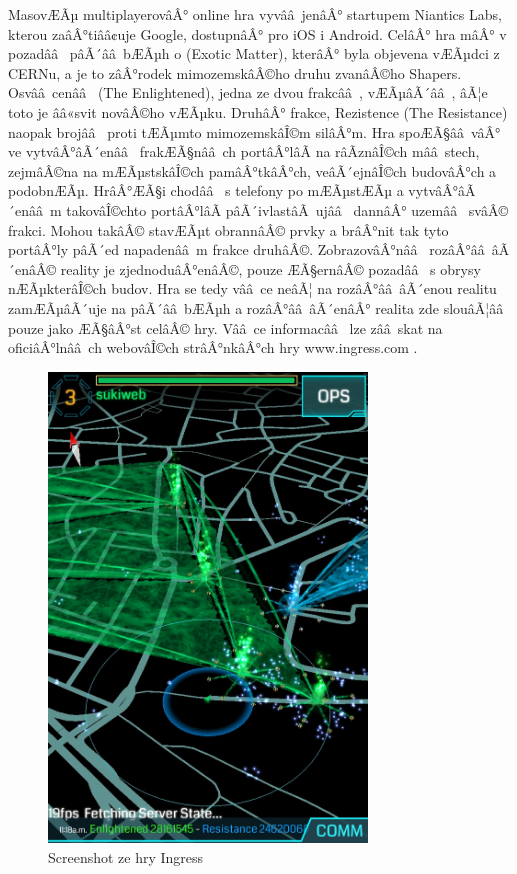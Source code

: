 \documentclass[twoside,12pt]{article}
\begin{document}
%
% 

MasovÆÃµ multiplayerovâÂ° online hra vyvââ jenâÂ° startupem Niantics Labs, kterou zaâÂ°tiââ¢uje Google, dostupnâÂ° pro iOS i Android. CelâÂ° hra mâÂ° v pozadââ  pâÃ´ââ bÆÃµh o  (Exotic Matter), kterâÂ° byla objevena vÆÃµdci z CERNu, a je to zâÂ°rodek mimozemskâÂ©ho druhu zvanâÂ©ho Shapers. Osvââ cenââ  (The Enlightened), jedna ze dvou frakcââ , vÆÃµâÃ´ââ , âÃ¦e toto je ââ«svit novâÂ©ho vÆÃµku. DruhâÂ° frakce, Rezistence (The Resistance) naopak brojââ  proti tÆÃµmto mimozemskâÎ©m silâÂ°m. Hra spoÆÃ§ââ vâÂ° ve vytvâÂ°âÃ´enââ  frakÆÃ§nââ ch portâÂ°lâÃ na râÃznâÎ©ch mââ stech, zejmâÂ©na na mÆÃµstskâÎ©ch pamâÂ°tkâÂ°ch, veâÃ´ejnâÎ©ch budovâÂ°ch a podobnÆÃµ. HrâÂ°ÆÃ§i chodââ  s telefony po mÆÃµstÆÃµ a vytvâÂ°âÃ´enââ m takovâÎ©chto portâÂ°lâÃ pâÃ´ivlastâÃ ujââ  dannâÂ° uzemââ  svâÂ© frakci. Mohou takâÂ© stavÆÃµt obrannâÂ© prvky a brâÂ°nit tak tyto portâÂ°ly pâÃ´ed napadenââ m frakce druhâÂ©. ZobrazovâÂ°nââ  rozâÂ°ââ âÃ´enâÂ© reality je zjednoduâÂ°enâÂ©, pouze ÆÃ§ernâÂ© pozadââ  s obrysy nÆÃµkterâÎ©ch budov. Hra se tedy vââ ce neâÃ¦ na rozâÂ°ââ âÃ´enou realitu zamÆÃµâÃ´uje na pâÃ´ââ bÆÃµh a rozâÂ°ââ âÃ´enâÂ° realita zde slouâÃ¦ââ  pouze jako ÆÃ§âÂ°st celâÂ© hry. Vââ ce informacââ  lze zââ skat na oficiâÂ°lnââ ch webovâÎ©ch strâÂ°nkâÂ°ch hry www.ingress.com \cite{ingress}.


\begin{figure}[H]
    \includegraphics[width=320px, center]{images/ingress.jpg}
    \caption{Screenshot ze hry Ingress}
    \label{ingress_screenshot}
\end{figure}
\end{document}
